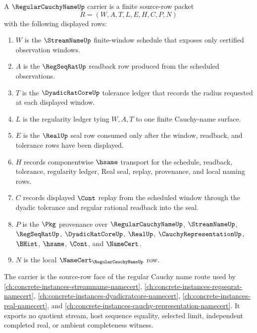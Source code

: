 \begin{definition}
\label{def:regular-cauchy-name-carrier}
A $\RegularCauchyNameUp$ carrier is a finite source-row packet
$$
R=(W,A,T,L,E,H,C,P,N)
$$
with the following displayed rows:
\begin{enumerate}
\item $W$ is the $\StreamNameUp$ finite-window schedule that exposes only certified observation windows.
\item $A$ is the $\RegSeqRatUp$ readback row produced from the scheduled observations.
\item $T$ is the $\DyadicRatCoreUp$ tolerance ledger that records the radius requested at each displayed window.
\item $L$ is the regularity ledger tying $W,A,T$ to one finite Cauchy-name surface.
\item $E$ is the $\RealUp$ seal row consumed only after the window, readback, and tolerance rows have been displayed.
\item $H$ records componentwise $\hsame$ transport for the schedule, readback, tolerance, regularity ledger, Real seal, replay, provenance, and local naming rows.
\item $C$ records displayed $\Cont$ replay from the scheduled window through the dyadic tolerance and regular rational readback into the seal.
\item $P$ is the $\Pkg$ provenance over $\RegularCauchyNameUp$, $\StreamNameUp$, $\RegSeqRatUp$, $\DyadicRatCoreUp$, $\RealUp$, $\CauchyRepresentationUp$, $\BHist$, $\hsame$, $\Cont$, and $\NameCert$.
\item $N$ is the local $\NameCert_{\RegularCauchyNameUp}$ row.
\end{enumerate}
The carrier is the source-row face of the regular Cauchy name route used by \autoref{ch:concrete-instances-streamname-namecert}, \autoref{ch:concrete-instances-regseqrat-namecert}, \autoref{ch:concrete-instances-dyadicratcore-namecert}, \autoref{ch:concrete-instances-real-namecert}, and \autoref{ch:concrete-instances-cauchy-representation-namecert}. It exports no quotient stream, host sequence equality, selected limit, independent completed real, or ambient completeness witness.
\end{definition}

